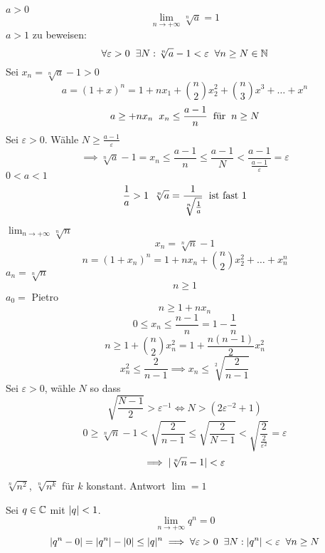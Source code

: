 \begin{Bsp}
  $a>0$
  \[\lim_{n\to+\infty}\sqrt[n]{a}=1\]
  $a>1$ zu beweisen:
  \[\forall \varepsilon>0 \hspace{2mm}\exists N:\sqrt[n]{a}-1<\varepsilon\hspace{2mm}\forall n\geq N\in\mathbb{N}\]
  Sei $x_n=\sqrt[n]{a}-1>0$
  \[a=(1+x)^n=1+nx_1+\binom{n}{2}x^2_2+\binom{n}{3}x^3+\dots+x^n\]
  \[a\geq +nx_n\hspace{2mm} x_n\leq\frac{a-1}{n}\hspace{2mm}\text{für}\hspace{2mm} n\geq N\]
  Sei $\varepsilon>0$. Wähle $N\geq \frac{a-1}{\varepsilon}$
  \[\implies\sqrt[n]{a}-1=x_n\leq\frac{a-1}{n}\leq\frac{a-1}{N}<\frac{a-1}{\frac{a-1}{\varepsilon}}=\varepsilon\]
  $0<a<1$
  \[\frac{1}{a}>1\hspace{2mm}\sqrt[n]{a}=\frac{1}{\sqrt[n]{\frac{1}{a}}}\hspace{2mm}\text{ist fast 1}\]
\end{Bsp}
\begin{Bsp}
  $\lim_{n\to+\infty}\sqrt[n]{n}$
  \[x_n=\sqrt[n]{n}-1\]
  \[n=(1+x_n)^n=1+nx_n+\binom{n}{2}x_2^2+\dots+x_n^n\]
  $a_n=\sqrt[n]{n}$
  \[n\geq 1\]
  $a_0=$ Pietro %
  \[n\geq 1+nx_n\]
  \[0\leq x_n\leq\frac{n-1}{n}=1-\frac{1}{n}\]
  \[n\geq1+\binom{n}{2} x_n^2=1+\frac{n(n-1)}{2}x_n^2 \]
  \[x_n^2\leq\frac{2}{n-1}\implies x_n\leq \sqrt[2]{\frac{2}{n-1}}\]
  Sei $\varepsilon>0$, wähle $N$ so dass
  \[\sqrt{\frac{N-1}{2}}>\varepsilon^{-1}\iff N>\left( 2\varepsilon^{-2}+1 \right)\]
  \[0\geq\sqrt[n]{n}-1<\sqrt{\frac{2}{n-1}}\leq\sqrt{\frac{2}{N-1}}<\sqrt{\frac{2}{\frac{2}{\varepsilon^2}}}=\varepsilon\]
  \[\implies \mathopen| \sqrt[n]{n}-1 \mathclose|<\varepsilon\]
\end{Bsp}
\begin{Ueb}
  $\sqrt[n]{n^2}$, $\sqrt[n]{n^k}$ für $k$ konstant. Antwort $\lim = 1$
\end{Ueb}
\begin{Bsp}
  Sei $q\in\mathbb{C}$ mit $\mathopen| q \mathclose|<1$.
  \[\lim_{n\to+\infty}q^n=0\]
  \[\mathopen| q^n-0 \mathclose|=\mathopen| q^n \mathclose|-\mathopen| 0 \mathclose|\leq\mathopen| q \mathclose|^n\implies\forall \varepsilon>0\hspace{2mm} \exists N:\mathopen| q^n \mathclose|<\varepsilon\hspace{2mm}\forall n\geq N\]
\end{Bsp}
